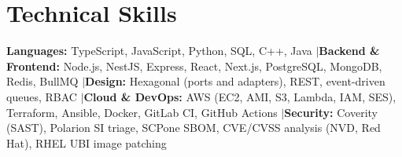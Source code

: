 \section{Technical Skills}
 \begin{itemize}[leftmargin=0.15in, label={}, itemsep=0pt, topsep=0pt, parsep=0pt, partopsep=0pt]
    \small{\item
     \textbf{Languages:} TypeScript, JavaScript, Python, SQL, C++, Java
     \enspace$|$\enspace \textbf{Backend \& Frontend:} Node.js, NestJS, Express, React, Next.js, PostgreSQL, MongoDB, Redis, BullMQ
     \enspace$|$\enspace \textbf{Design:} Hexagonal (ports and adapters), REST, event-driven queues, RBAC
     \enspace$|$\enspace \textbf{Cloud \& DevOps:} AWS (EC2, AMI, S3, Lambda, IAM, SES), Terraform, Ansible, Docker, GitLab CI, GitHub Actions
     \enspace$|$\enspace \textbf{Security:} Coverity (SAST), Polarion SI triage, SCPone SBOM, CVE/CVSS analysis (NVD, Red Hat), RHEL UBI image patching
    }
 \end{itemize}
